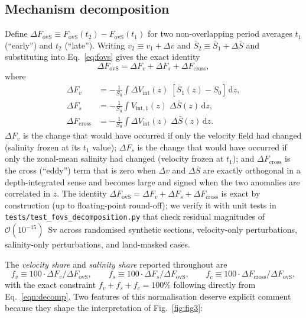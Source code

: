 \documentclass[12pt,a4paper]{article}
\newcommand{\Fovs}{F_\mathrm{ovS}}
\newcommand{\dFv}{\Delta F_v}
\newcommand{\dFs}{\Delta F_s}
\newcommand{\dFc}{\Delta F_\mathrm{cross}}
\begin{document}
\subsection*{Mechanism decomposition}

Define $\Delta\Fovs \equiv \Fovs(t_2) - \Fovs(t_1)$ for two
non-overlapping period averages $t_1$ (``early'') and $t_2$
(``late''). Writing $v_2 \equiv v_1 + \Delta v$ and $\bar{S}_2
\equiv \bar{S}_1 + \Delta\bar{S}$ and substituting into
Eq.~\eqref{eq:fovs} gives the exact identity
\begin{equation}
\Delta \Fovs = \dFv + \dFs + \dFc,
\label{eqn:decomp}
\end{equation}
where
\begin{align}
\dFv &= -\tfrac{1}{S_0}\int \Delta V_\mathrm{int}(z)\;
  [\bar{S}_1(z) - S_0]\,\mathrm{d}z, \\[2pt]
\dFs &= -\tfrac{1}{S_0}\int V_{\mathrm{int}, 1}(z)\;
  \Delta\bar{S}(z)\,\mathrm{d}z, \\[2pt]
\dFc &= -\tfrac{1}{S_0}\int \Delta V_\mathrm{int}(z)\;
  \Delta\bar{S}(z)\,\mathrm{d}z.
\end{align}
$\dFv$ is the change that would have occurred if only the velocity
field had changed (salinity frozen at its $t_1$ value); $\dFs$ is the
change that would have occurred if only the zonal-mean salinity had
changed (velocity frozen at $t_1$); and $\dFc$ is the cross (``eddy'')
term that is zero when $\Delta v$ and $\Delta\bar{S}$ are exactly
orthogonal in a depth-integrated sense and becomes large and
signed when the two anomalies are correlated in $z$. The identity
$\Delta\Fovs = \dFv + \dFs + \dFc$ is exact by construction (up to
floating-point round-off); we verify it with unit tests in
\texttt{tests/test\_fovs\_decomposition.py} that check residual
magnitudes of $\mathcal{O}(10^{-15})$~Sv across randomised synthetic
sections, velocity-only perturbations, salinity-only perturbations,
and land-masked cases.

The \emph{velocity share} and \emph{salinity share} reported
throughout are
\begin{equation}
f_v \equiv 100\cdot \dFv/\Delta\Fovs,\qquad
f_s \equiv 100\cdot \dFs/\Delta\Fovs,\qquad
f_c \equiv 100\cdot \dFc/\Delta\Fovs,
\label{eq:shares}
\end{equation}
with the exact constraint $f_v + f_s + f_c = 100\%$ following
directly from Eq.~\eqref{eqn:decomp}. Two features of this
normalisation deserve explicit comment because they shape the
interpretation of Fig.~\ref{fig:fig3}:
\end{document}
